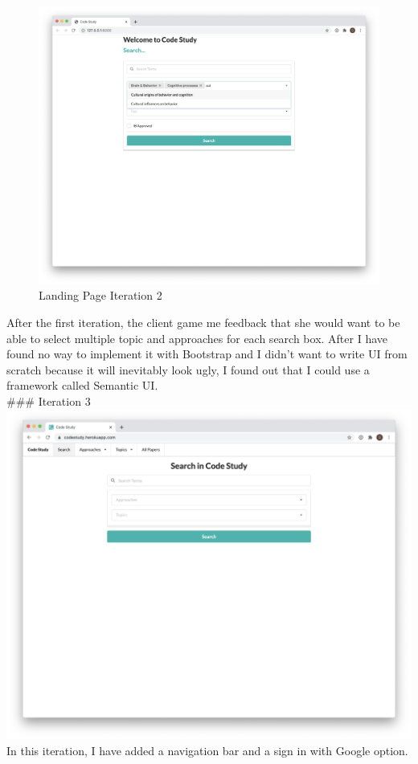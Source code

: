 \documentclass[
]{article}
\begin{document}
\begin{figure}
\centering
\includegraphics{img/landing page iteration 2.png}
\caption{Landing Page Iteration 2}
\end{figure}

After the first iteration, the client game me feedback that she would
want to be able to select multiple topic and approaches for each search
box. After I have found no way to implement it with Bootstrap and I
didn't want to write UI from scratch because it will inevitably look
ugly, I found out that I could use a framework called Semantic UI.\\
\#\#\# Iteration 3 \includegraphics{img/landing page iteration 3.png}\\
In this iteration, I have added a navigation bar and a sign in with
Google option.
\end{document}
